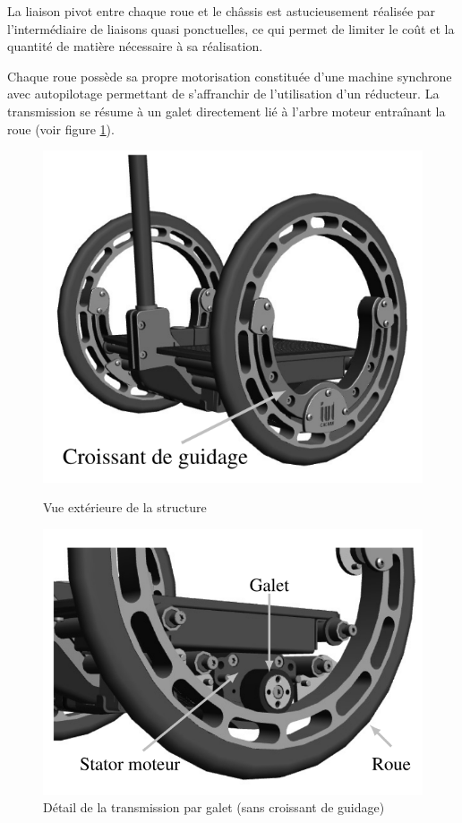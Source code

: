 La liaison pivot entre chaque roue et le châssis est astucieusement réalisée par l'intermédiaire de liaisons quasi ponctuelles, ce qui permet de limiter le coût et la quantité de matière nécessaire à sa réalisation.
 
Chaque roue possède sa propre motorisation constituée d'une machine synchrone avec autopilotage permettant de s'affranchir de l'utilisation d'un réducteur. La transmission se résume à un galet directement lié à l'arbre moteur entraînant la roue (voir figure \ref{fig04}).

\begin{figure}[ht!]
 \begin{minipage}{0.45\linewidth}
 \includegraphics[width=\linewidth]{img/fig03}
 \caption{\label{fig03}Vue extérieure de la structure}
 \end{minipage}\hfill
 \begin{minipage}{0.45\linewidth}
 \includegraphics[width=\linewidth]{img/fig04}
 \caption{\label{fig04}Détail de la transmission par galet (sans croissant de guidage)}
 \end{minipage}
\end{figure}

